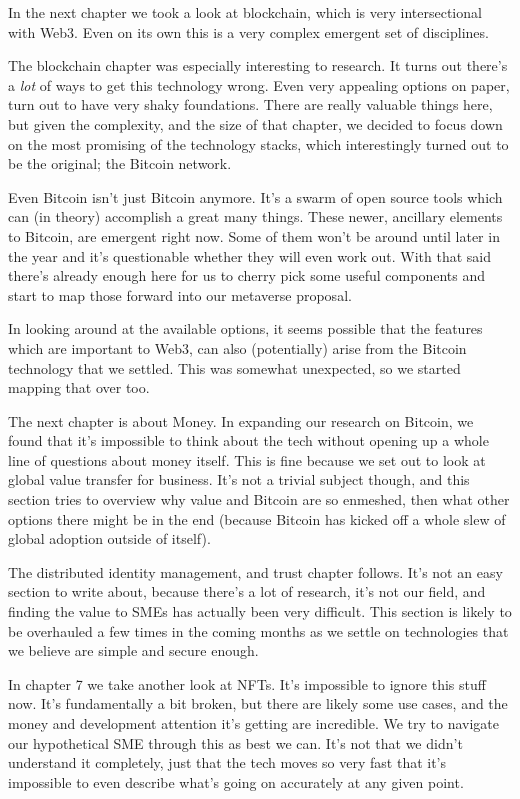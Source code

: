 In the next chapter we took a look at blockchain, which is very intersectional with Web3. Even on its own this is a very complex emergent set of disciplines. \par
The blockchain chapter was especially interesting to research. It turns out there’s a \textit{lot} of ways to get this technology wrong. Even very appealing options on paper, turn out to have very shaky foundations. There are really valuable things here, but given the complexity, and the size of that chapter, we decided to focus down on the most promising of the technology stacks, which interestingly turned out to be the original; the Bitcoin network.\par
Even Bitcoin isn’t just Bitcoin anymore. It’s a swarm of open source tools which can (in theory) accomplish a great many things. These newer, ancillary elements to Bitcoin, are emergent right now. Some of them won’t be around until later in the year and it’s questionable whether they will even work out. With that said there’s already enough here for us to cherry pick some useful components and start to map those forward into our metaverse proposal.\par
In looking around at the available options, it seems possible that the features which are important to Web3, can also (potentially) arise from the Bitcoin technology that we settled. This was somewhat unexpected, so we started mapping that over too.\par
The next chapter is about Money. In expanding our research on Bitcoin, we found that it’s impossible to think about the tech without opening up a whole line of questions about money itself. This is fine because we set out to look at global value transfer for business. It’s not a trivial subject though, and this section tries to overview why value and Bitcoin are so enmeshed, then what other options there might be in the end (because Bitcoin has kicked off a whole slew of global adoption outside of itself).\par
The distributed identity management, and trust chapter follows. It’s not an easy section to write about, because there’s a lot of research, it’s not our field, and finding the value to SMEs has actually been very difficult. This section is likely to be overhauled a few times in the coming months as we settle on technologies that we believe are simple and secure enough.\par
In chapter 7 we take another look at NFTs. It’s impossible to ignore this stuff now. It’s fundamentally a bit broken, but there are likely some use cases, and the money and development attention it’s getting are incredible. We try to navigate our hypothetical SME through this as best we can. It’s not that we didn’t understand it completely, just that the tech moves so very fast that it’s impossible to even describe what’s going on accurately at any given point. \par
